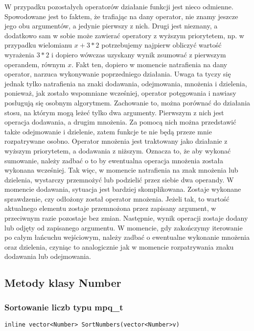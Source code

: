 \documentclass[twoside,a4paper]{book}
\begin{document}
W przypadku pozostałych operatorów działanie funkcji jest nieco odmienne. Spowodowane jest to faktem, że trafiając na dany operator, nie znamy jeszcze jego obu argumentów, a jedynie pierwszy z nich. Drugi jest nieznany, a dodatkowo sam w sobie może zawierać operatory z wyższym priorytetem, np. w przypadku wielomianu $x+3*2$ potrzebujemy najpierw obliczyć wartość wyrażenia $3*2$ i dopiero wówczas uzyskany wynik zsumować z pierwszym operandem, równym $x$. Fakt ten, dopiero w momencie natrafienia na dany operator, narzuca wykonywanie poprzedniego działania. Uwaga ta tyczy się jednak tylko natrafienia na znaki dodawania, odejmowania, mnożenia i dzielenia, ponieważ, jak zostało wspomniane wcześniej, operator potęgowania i nawiasy posługują się osobnym algorytmem. Zachowanie to, można porównać do działania stosu, na którym mogą leżeć tylko dwa argumenty. Pierwszym z nich jest operacja dodawania, a drugim mnożenia. Za pomocą nich można przedstawić także odejmowanie i dzielenie, zatem funkcje te nie będą przeze mnie rozpatrywane osobno. Operator mnożenia jest traktowany jako działanie z wyższym priorytetem, a dodawania z niższym. Oznacza to, że aby wykonać sumowanie, należy zadbać o to by ewentualna operacja mnożenia została wykonana wcześniej. Tak więc, w momencie natrafienia na znak mnożenia lub dzielenia, wystarczy przemnożyć lub podzielić przez siebie dwa operandy. W momencie dodawania, sytuacja jest bardziej skomplikowana. Zostaje wykonane sprawdzenie, czy odłożony został operator mnożenia. Jeżeli tak, to wartość aktualnego elementu zostaje przemnożona przez zapisany argument, w przeciwnym razie pozostaje bez zmian. Następnie, wynik operacji zostaje dodany lub odjęty od zapisanego argumentu. W momencie, gdy zakończymy iterowanie po całym łańcuchu wejściowym, należy zadbać o ewentualne wykonanie mnożenia oraz dzielenia, czyniąc to analogicznie jak w momencie rozpatrywania znaku dodawania lub odejmowania.
\\

\subsection{Metody klasy Number}

\subsubsection{Sortowanie liczb typu mpq\_t}
\begin{lstlisting}
inline vector<Number> SortNumbers(vector<Number>v)
\end{lstlisting}
\end{document}
